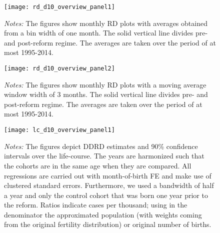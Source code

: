 \begin{landscape}
\begin{figure}[H]
	\centering
	\begin{minipage}{.95\linewidth}
	\texttt{[image: rd\_d10\_overview\_panel1]}
	{\scriptsize \emph{Notes:} The figures show monthly RD plots with averages obtained from a bin width of one month. The solid vertical line divides pre- and post-reform regime. The averages are taken over the period of at most 1995-2014. \par}
\end{minipage}
\end{figure}
\end{landscape}
\begin{landscape}
\begin{figure}[H]
	\centering
\begin{minipage}{.95\linewidth}
	\texttt{[image: rd\_d10\_overview\_panel2]}
	{\scriptsize \emph{Notes:} The figures show monthly RD plots with a moving average window width of 3 months. The solid vertical line divides pre- and post-reform regime. The averages are taken over the period of at most 1995-2014. \par}
\end{minipage}
\end{figure}
\end{landscape}


\begin{landscape}
\begin{figure}[H]
\centering
\begin{minipage}{.9\linewidth}
\texttt{[image: lc\_d10\_overview\_panel1]}
{\scriptsize \emph{Notes:} The figures depict DDRD estimates and 90\% confidence intervals over the life-course. The years are harmonized such that the cohorts are in the same age when they are compared. All regressions are carried out with month-of-birth FE and make use of clustered standard errors. Furthermore, we used a bandwidth of half a year and only the control cohort that was born one year prior to the reform. Ratios indicate cases per thousand; using in the denominator the approximated population (with weights coming from the original fertility distribution) or original number of births. \par}
\end{minipage}
\end{figure}
\end{landscape}
